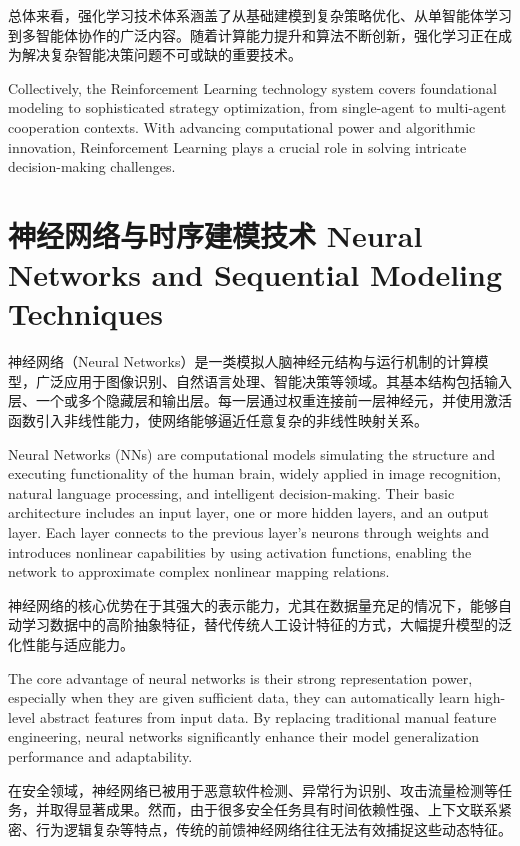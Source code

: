 总体来看，强化学习技术体系涵盖了从基础建模到复杂策略优化、从单智能体学习到多智能体协作的广泛内容。随着计算能力提升和算法不断创新，强化学习正在成为解决复杂智能决策问题不可或缺的重要技术。

Collectively, the Reinforcement Learning technology system covers foundational modeling to sophisticated strategy optimization, from single-agent to multi-agent cooperation contexts. With advancing computational power and algorithmic innovation, Reinforcement Learning plays a crucial role in solving intricate decision-making challenges.

\section{神经网络与时序建模技术 Neural Networks and Sequential Modeling Techniques}

神经网络（Neural Networks）是一类模拟人脑神经元结构与运行机制的计算模型，广泛应用于图像识别、自然语言处理、智能决策等领域。其基本结构包括输入层、一个或多个隐藏层和输出层。每一层通过权重连接前一层神经元，并使用激活函数引入非线性能力，使网络能够逼近任意复杂的非线性映射关系。

Neural Networks (NNs) are computational models simulating the structure and executing functionality of the human brain, widely applied in image recognition, natural language processing, and intelligent decision-making. Their basic architecture includes an input layer, one or more hidden layers, and an output layer. Each layer connects to the previous layer's neurons through weights and introduces nonlinear capabilities by using activation functions, enabling the network to approximate complex nonlinear mapping relations.

神经网络的核心优势在于其强大的表示能力，尤其在数据量充足的情况下，能够自动学习数据中的高阶抽象特征，替代传统人工设计特征的方式，大幅提升模型的泛化性能与适应能力。

The core advantage of neural networks is their strong representation power, especially when they are given sufficient data, they can automatically learn high-level abstract features from input data. By replacing traditional manual feature engineering, neural networks significantly enhance their model generalization performance and adaptability.

在安全领域，神经网络已被用于恶意软件检测、异常行为识别、攻击流量检测等任务，并取得显著成果。然而，由于很多安全任务具有时间依赖性强、上下文联系紧密、行为逻辑复杂等特点，传统的前馈神经网络往往无法有效捕捉这些动态特征。

